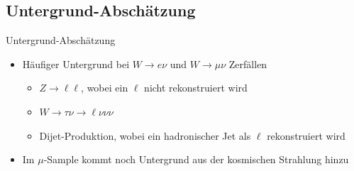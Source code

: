 \documentclass[aspectratio=1610, 9pt]{beamer}
\begin{document}
\subsection{Untergrund-Abschätzung}

\begin{frame}{Untergrund-Abschätzung}
  \begin{itemize}
    \item Häufiger Untergrund bei $W \rightarrow e \nu$ und $W \rightarrow \mu \nu$ Zerfällen
    \begin{itemize}
      \item $Z \rightarrow \ell \ell$, wobei ein $\ell$ nicht rekonstruiert wird
      \item $W \rightarrow \tau \nu \rightarrow \ell \nu \nu \nu$
      \item Dijet-Produktion, wobei ein hadronischer Jet als $\ell$ rekonstruiert wird
    \end{itemize}
    \item Im $\mu$-Sample kommt noch Untergrund aus der kosmischen Strahlung hinzu
  \end{itemize}
%
%


\end{frame}
\end{document}
